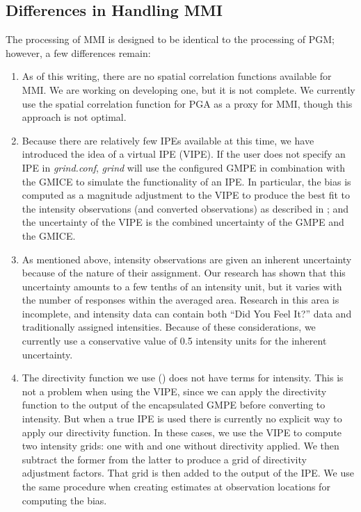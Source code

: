 \documentclass[letterpaper,10pt,english]{sphinxmanual}
\begin{document}
\subsection{Differences in Handling MMI}
\label{tg_processing:differences-in-handling-mmi}
The processing of MMI is designed to be identical to the processing of PGM; however, a
few differences remain:
\begin{enumerate}
\item {} 
As of this writing, there are no spatial correlation functions available for MMI.
We are working on developing one, but it is not complete. We currently use the
spatial correlation function for PGA as a proxy for MMI, though this approach is
not optimal.

\item {} 
Because there are relatively few IPEs available at this time, we have introduced
the idea of a virtual IPE (VIPE). If the user does not specify an IPE in \emph{grind.conf},
\emph{grind} will use the configured GMPE in combination with the GMICE to simulate
the functionality of an IPE. In particular, the bias is computed as a magnitude
adjustment to the VIPE to produce the best fit to the intensity observations (and
converted observations) as described in {\hyperref[tg_processing:sec\string-event\string-bias]{}}; and the
uncertainty of the VIPE is the combined uncertainty of the GMPE and the
GMICE.

\item {} 
As mentioned above, intensity observations are given an inherent uncertainty
because of the nature of their assignment. Our research has shown that this
uncertainty amounts to a few tenths of an intensity unit, but it varies with the
number of responses within the averaged area. Research in this area is incomplete,
and intensity data can contain both ``Did You Feel It?'' data and traditionally
assigned intensities. Because of these considerations, we currently use a
conservative value of 0.5 intensity units for the inherent uncertainty.

\item {} 
The directivity function we use ({\hyperref[references:rowshandel2010]{}}) does not have terms for
intensity. This is not a problem when using the VIPE, since we can apply the
directivity function to the output of the encapsulated GMPE before converting to
intensity. But when a true IPE is used there is currently no explicit way to apply our
directivity function.  In these cases, we use the VIPE to
compute two intensity grids: one with and one without directivity applied. We
then subtract the former from the latter to produce a grid of directivity adjustment
factors. That grid is then added to the output of the
IPE. We use the same procedure when creating estimates at observation locations
for computing the bias.


\end{enumerate}
\end{document}
